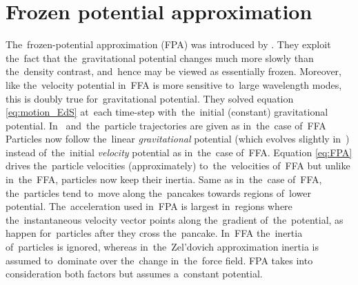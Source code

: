 \section{Frozen potential approximation}
The~frozen-potential approximation (FPA) was introduced by \textcite{1994MNRAS.266..227B}. They exploit the~fact that the~gravitational potential changes much more slowly than the~density contrast, and~hence may be viewed as essentially frozen. Moreover, like the~velocity potential in~FFA is more sensitive to~large wavelength modes, this is doubly true for~gravitational potential. They solved equation \eqref{eq:motion_EdS} at~each time-step with~the~initial (constant) gravitational potential. In~\LCDM
{}
and~the~particle trajectories are given as in~the~case of~FFA\,
Particles now follow the~linear \textit{gravitational} potential (which evolves slightly in~\LCDM) instead of~the~initial \textit{velocity} potential as in~the~case of~FFA. Equation \eqref{eq:FPA} drives the~particle velocities (approximately) to~the~velocities of~FFA but unlike in~the~FFA, particles now keep their inertia. Same as in~the~case of~FFA, the~particles tend to~move along the~pancakes towards regions of~lower potential\DIFdelbegin {}\DIFdelend . The~acceleration used in~FPA is largest in~regions where the~instantaneous velocity vector points along the~gradient of~the~potential, as happen for~particles after they cross the~pancake. In~FFA the~inertia of~particles is ignored, whereas in~the~Zel'dovich approximation inertia is assumed to~dominate over the~change in~the~force field. FPA takes into consideration both factors but assumes a~constant potential.

